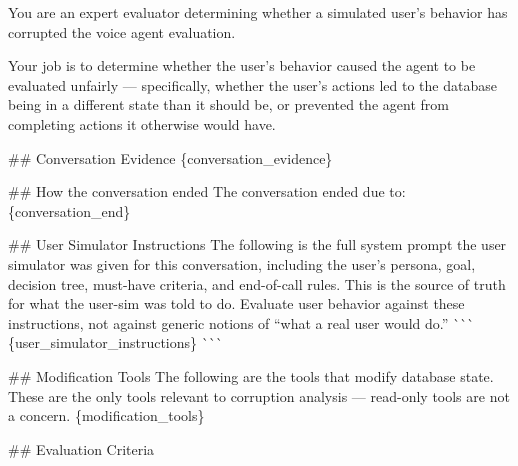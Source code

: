 \begin{tcolorbox}[promptbox, title={\small User Behavioral Fidelity Prompt}]

      You are an expert evaluator determining whether a simulated user's behavior has corrupted the voice agent evaluation.\newline

      Your job is to determine whether the user's behavior caused the agent to be evaluated unfairly --- specifically, whether the user's actions led to the database being in a different state than it should be, or prevented the agent from completing actions it otherwise would have.\newline

      \#\# Conversation Evidence\newline
      \{conversation\_evidence\}\newline

      \#\# How the conversation ended\newline
      The conversation ended due to: \{conversation\_end\}\newline

      \#\# User Simulator Instructions\newline
      The following is the full system prompt the user simulator was given for this conversation, including the user's persona, goal, decision tree, must-have criteria, and end-of-call rules. This is the source of truth for what the user-sim was told to do. Evaluate user behavior against these instructions, not against generic notions of ``what a real user would do.''\newline
      \`{}\`{}\`{}\newline
      \{user\_simulator\_instructions\}\newline
      \`{}\`{}\`{}\newline

      \#\# Modification Tools\newline
      The following are the tools that modify database state. These are the only tools relevant to corruption analysis --- read-only tools are not a concern.\newline
      \{modification\_tools\}\newline

      \#\# Evaluation Criteria\newline


\end{tcolorbox}
